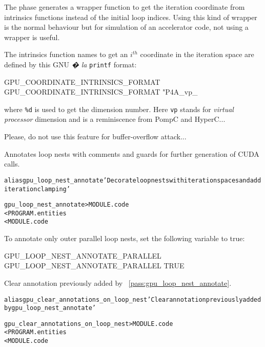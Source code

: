 \documentclass[a4paper]{report}
\newenvironment{PipsMake}{\begin{alltt}}{\end{alltt}}
\newcommand{\PipsPassRef}[1]{\texttt{\detokenize{#1}}~\ref{pass:#1}}
\newenvironment{PipsPass}[1]{\label{pass:#1}}{}
\begin{document}
The phase generates a wrapper function to get the iteration coordinate from
intrinsics functions instead of the initial loop indices. Using this kind
of wrapper is the normal behaviour but for simulation of an accelerator
code, not using a wrapper is useful.

The intrinsics function names to get an $i^{th}$ coordinate in the
iteration space are defined by this GNU \emph{� la} \texttt{printf}
format:
\begin{PipsProp}{GPU_COORDINATE_INTRINSICS_FORMAT}
GPU_COORDINATE_INTRINSICS_FORMAT "P4A_vp_%
\end{PipsProp}
where \verb|%d| is used to get the dimension number. Here \texttt{vp}
stands for \emph{virtual processor} dimension and is a reminiscence from
PompC and HyperC...

Please, do not use this feature for buffer-overflow attack...



\begin{PipsPass}{gpu_loop_nest_annotate}
Annotates loop nests with comments and guards for further generation of CUDA calls.
\end{PipsPass}

\begin{PipsMake}
alias gpu_loop_nest_annotate 'Decorate loop nests with iteration spaces and add iteration clamping'

gpu_loop_nest_annotate	        > MODULE.code
        < PROGRAM.entities
        < MODULE.code

\end{PipsMake}

To annotate only outer parallel loop nests, set the following variable to true:
\begin{PipsProp}{GPU_LOOP_NEST_ANNOTATE_PARALLEL}
GPU_LOOP_NEST_ANNOTATE_PARALLEL TRUE
\end{PipsProp}



\begin{PipsPass}{gpu_clear_annotations_on_loop_nest}
Clear annotation previously added by \PipsPassRef{gpu_loop_nest_annotate}.
\end{PipsPass}

\begin{PipsMake}
alias gpu_clear_annotations_on_loop_nest 'Clear annotation previously added by gpu_loop_nest_annotate'

gpu_clear_annotations_on_loop_nest   > MODULE.code
        < PROGRAM.entities
        < MODULE.code
\end{PipsMake}
\end{document}
